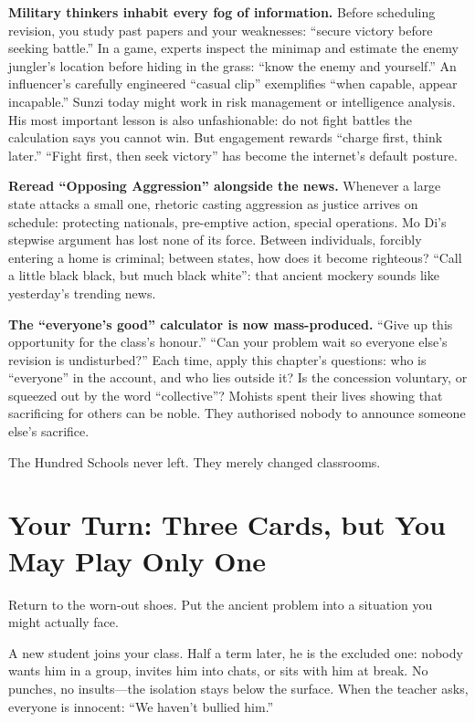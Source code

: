 \textbf{Military thinkers inhabit every fog of information.} Before scheduling revision, you study past papers and your weaknesses: ``secure victory before seeking battle.'' In a game, experts inspect the minimap and estimate the enemy jungler's location before hiding in the grass: ``know the enemy and yourself.'' An influencer's carefully engineered ``casual clip'' exemplifies ``when capable, appear incapable.'' Sunzi today might work in risk management or intelligence analysis. His most important lesson is also unfashionable: do not fight battles the calculation says you cannot win. But engagement rewards ``charge first, think later.'' ``Fight first, then seek victory'' has become the internet's default posture.

\textbf{Reread ``Opposing Aggression'' alongside the news.} Whenever a large state attacks a small one, rhetoric casting aggression as justice arrives on schedule: protecting nationals, pre-emptive action, special operations. Mo Di's stepwise argument has lost none of its force. Between individuals, forcibly entering a home is criminal; between states, how does it become righteous? ``Call a little black black, but much black white'': that ancient mockery sounds like yesterday's trending news.

\textbf{The ``everyone's good'' calculator is now mass-produced.} ``Give up this opportunity for the class's honour.'' ``Can your problem wait so everyone else's revision is undisturbed?'' Each time, apply this chapter's questions: who is ``everyone'' in the account, and who lies outside it? Is the concession voluntary, or squeezed out by the word ``collective''? Mohists spent their lives showing that sacrificing for others can be noble. They authorised nobody to announce someone else's sacrifice.

The Hundred Schools never left. They merely changed classrooms.

\section[Your Turn: Play One of Three Cards]{Your Turn: Three Cards, but You May Play Only One}
Return to the worn-out shoes. Put the ancient problem into a situation you might actually face.

A new student joins your class. Half a term later, he is the excluded one: nobody wants him in a group, invites him into chats, or sits with him at break. No punches, no insults---the isolation stays below the surface. When the teacher asks, everyone is innocent: ``We haven't bullied him.''


